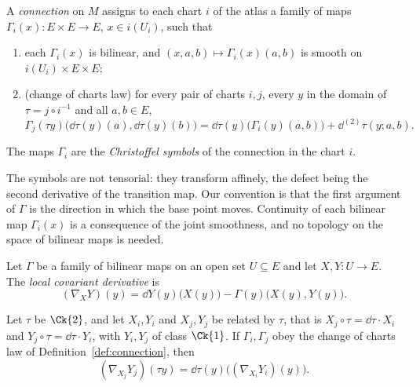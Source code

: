 \begin{definition}[Connection]
  \label{def:connection}
  \leanok
  A \emph{connection} on $M$ assigns to each chart $i$ of the atlas a family of maps
  $\Gamma_i(x) \colon E \times E \to E$, $x \in i(U_i)$, such that
  \begin{enumerate}
    \item each $\Gamma_i(x)$ is bilinear, and $(x, a, b) \mapsto \Gamma_i(x)(a, b)$ is smooth on
    $i(U_i) \times E \times E$;
    \item (change of charts law) for every pair of charts $i, j$, every $y$ in the domain of
    $\tau = j \circ i^{-1}$ and all $a, b \in E$,
    \[
      \Gamma_j(\tau y)\bigl(\dd\tau(y)(a), \dd\tau(y)(b)\bigr)
        = \dd\tau(y)\bigl(\Gamma_i(y)(a, b)\bigr) + \dd^{(2)}\tau(y; a, b).
    \]
  \end{enumerate}
  The maps $\Gamma_i$ are the \emph{Christoffel symbols} of the connection in the chart $i$.
\end{definition}

The symbols are not tensorial: they transform affinely, the defect being the second derivative of
the transition map. Our convention is that the first argument of $\Gamma$ is the direction in
which the base point moves. Continuity of each bilinear map $\Gamma_i(x)$ is a consequence of the
joint smoothness, and no topology on the space of bilinear maps is needed.

\begin{definition}
  \label{def:conn-local-cov-deriv}
  \leanok
  Let $\Gamma$ be a family of bilinear maps on an open set $U \subseteq E$ and let
  $X, Y \colon U \to E$. The \emph{local covariant derivative} is
  \[
    (\nabla_X Y)(y) = \dd Y(y)\bigl(X(y)\bigr) - \Gamma(y)\bigl(X(y), Y(y)\bigr).
  \]
\end{definition}

\begin{lemma}
  \label{lem:conn-local-transition}
  \leanok
  Let $\tau$ be $\Ck{2}$, and let $X_i, Y_i$ and $X_j, Y_j$ be related by $\tau$, that is
  $X_j \circ \tau = \dd\tau \cdot X_i$ and $Y_j \circ \tau = \dd\tau \cdot Y_i$, with $Y_i, Y_j$
  of class $\Ck{1}$. If $\Gamma_i, \Gamma_j$ obey the change of charts law of
  Definition~\ref{def:connection}, then
  \[
    (\nabla_{X_j} Y_j)(\tau y) = \dd\tau(y)\bigl((\nabla_{X_i} Y_i)(y)\bigr).
  \]
\end{lemma}

